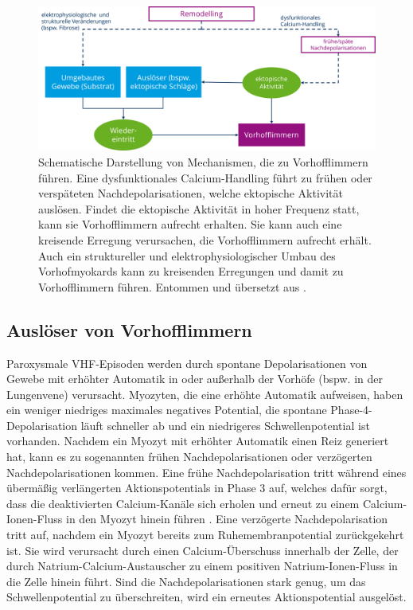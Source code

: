 \begin{figure}[!ht]%
\centering
	\includegraphics[width=1.0\textwidth]{./Bilder/VHFschematic_new.png}
\caption[Diagramm zur Pathophysiologie von VHF]{Schematische Darstellung von Mechanismen, die zu Vorhofflimmern führen. Eine dysfunktionales Calcium-Handling führt zu frühen oder verspäteten Nachdepolarisationen, welche ektopische Aktivität auslösen. Findet die ektopische Aktivität in hoher Frequenz statt, kann sie Vorhofflimmern aufrecht erhalten. Sie kann auch eine kreisende Erregung verursachen, die Vorhofflimmern aufrecht erhält. Auch ein struktureller und elektrophysiologischer Umbau des Vorhofmyokards kann zu kreisenden Erregungen und damit zu Vorhofflimmern führen. Entommen und übersetzt aus \cite{wijesurendra_mechanisms_2019}.} 
\label{fig:VHFschematic}
\end{figure} 

\subsection{Auslöser von Vorhofflimmern} \label{sec:auslöser}

Paroxysmale \gls{VHF}-Episoden werden durch spontane Depolarisationen von Gewebe mit erhöhter Automatik in oder außerhalb der Vorhöfe (bspw. in der Lungenvene) verursacht. Myozyten, die eine erhöhte Automatik aufweisen, haben ein weniger niedriges maximales negatives Potential, die spontane Phase-4-Depolarisation läuft schneller ab und ein niedrigeres Schwellenpotential ist vorhanden.
Nachdem ein Myozyt mit erhöhter Automatik einen Reiz generiert hat, kann es zu sogenannten frühen Nachdepolarisationen oder verzögerten Nachdepolarisationen kommen. Eine frühe Nachdepolarisation tritt während eines übermäßig verlängerten Aktionspotentials in Phase 3 auf, welches dafür sorgt, dass die deaktivierten Calcium-Kanäle sich erholen und erneut zu einem Calcium-Ionen-Fluss in den Myozyt hinein führen \cite{nattel_molecular_2020}. Eine verzögerte Nachdepolarisation tritt auf, nachdem ein Myozyt bereits zum Ruhemembranpotential zurückgekehrt ist. Sie wird verursacht durch einen Calcium-Überschuss innerhalb der Zelle, der durch Natrium-Calcium-Austauscher zu einem positiven Natrium-Ionen-Fluss in die Zelle hinein führt. Sind die Nachdepolarisationen stark genug, um das Schwellenpotential zu überschreiten, wird ein erneutes Aktionspotential ausgelöst. \cite{khan_identifying_2004}

